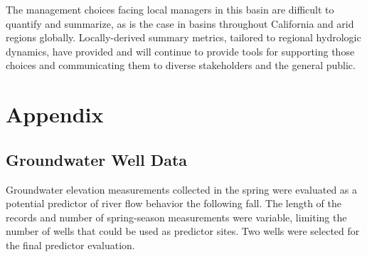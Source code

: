 \documentclass[hess, manuscript]{copernicus}
\begin{document}
The management choices facing local managers in this basin are difficult
to quantify and summarize, as is the case in basins throughout
California and arid regions globally. Locally-derived summary metrics,
tailored to regional hydrologic dynamics, have provided and will
continue to provide tools for supporting those choices and communicating
them to diverse stakeholders and the general public.

\section{Appendix}

\appendixfigures
\appendixtables

\subsection{Groundwater Well Data}

Groundwater elevation measurements collected in the spring were
evaluated as a potential predictor of river flow behavior the following
fall. The length of the records and number of spring-season measurements
were variable, limiting the number of wells that could be used as
predictor sites. Two wells were selected for the final predictor
evaluation.
\end{document}
